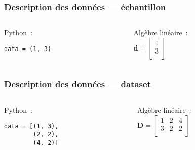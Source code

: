 \documentclass{formation}
\begin{document}
\begin{frame}[fragile]
  \frametitle{Description des données — échantillon}
  \begin{columns}
    \begin{column}{0.5\textwidth}
      Python :
      \begin{verbatim}
data = (1, 3)
      \end{verbatim}
    \end{column}
    \begin{column}{0.5\textwidth}
      Algèbre linéaire : \\[.3cm]

      \( \mathbf{d} = \begin{bmatrix}
        1 \\
        3 \\
      \end{bmatrix}
      \)
    \end{column}
  \end{columns}
\end{frame}

\begin{frame}[fragile]
  \frametitle{Description des données — dataset}
  \begin{columns}
    \begin{column}{0.5\textwidth}
      Python :
      \begin{verbatim}
data = [(1, 3),
        (2, 2),
        (4, 2)]
      \end{verbatim}
    \end{column}
    \begin{column}{0.5\textwidth}
      Algèbre linéaire : \\[.3cm]

      \(
      \mathbf{D} = \begin{bmatrix}
        1 & 2 & 4 \\
        3 & 2 & 2 \\
      \end{bmatrix}
      \)
    \end{column}
  \end{columns}
\end{frame}
\end{document}
